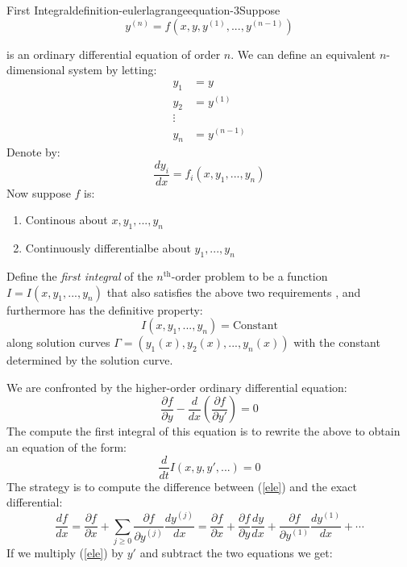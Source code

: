 \begin{mystthmdefinition}{First Integral}{definition-eulerlagrangeequation-3}Suppose
\begin{equation}
y^{(n)}=f(x,y,y^{(1)},...,y^{(n-1)})
\end{equation}

is an ordinary differential equation of order $n$. We can define an equivalent $n$-dimensional system by letting:
\begin{equation}
\begin{aligned}
y_1 &= y \\
y_2 &= y^{(1)} \\
\vdots \\
y_{n} &= y^{(n-1)}
\end{aligned}
\end{equation}
Denote by:
\begin{equation}
\frac{dy_i}{dx}=f_i(x,y_1,...,y_n)
\end{equation}
Now suppose $f$ is:

\begin{enumerate}
\item Continous about $x,y_1,...,y_n$
\item Continuously differentialbe about $y_1,...,y_n$
\end{enumerate}

Define  the \textit{first integral} of the $n^{\text{th}}$-order problem to be a function $I=I(x,y_1,...,y_n)$ that also satisfies the above two requirements , and furthermore has the definitive property:
\begin{equation}
I(x,y_1,...,y_n)=\text{Constant}
\end{equation}
along solution curves $\Gamma=(y_1(x),y_2(x),...,y_n(x))$ with the constant determined by the solution curve.

\end{mystthmdefinition}
We are confronted by the higher-order ordinary differential equation:
\begin{equation}
\label{ele}
\frac{\partial f}{\partial y} -\frac{d}{dx}\left( \frac{\partial f}{\partial y'}\right)=0
\end{equation}
The compute the first integral of this equation is to rewrite the above to obtain an equation of the form:
\begin{equation}
\frac{d}{dt}I(x,y,y',...)=0
\end{equation}
The strategy is to compute the difference between (\ref{ele}) and the exact differential:
\begin{equation}
\frac{df}{dx}=\frac{\partial f}{\partial x} + \sum_{j\geq 0}\frac{\partial f}{\partial y^{(j)}}\frac{dy^{(j)}}{dx}=\frac{\partial f}{\partial x} +\frac{\partial f}{\partial y}\frac{dy}{dx}+\frac{\partial f}{\partial y^{(1)}}\frac{dy^{(1)}}{dx}+\cdots
\end{equation}
If we multiply (\ref{ele}) by $y'$ and subtract the two equations we get:

